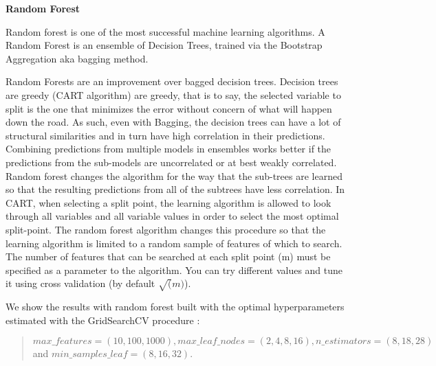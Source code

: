 \documentclass[11pt]{article}
\begin{document}
\textbf{Random Forest}

Random forest is one of the most successful machine learning algorithms. A Random Forest is an ensemble of Decision Trees, trained via the  Bootstrap Aggregation aka bagging method. 

Random Forests are an improvement over bagged decision trees. Decision trees are greedy (CART algorithm) are greedy, that is to say, the selected variable to split is the one that minimizes the error without concern of what will happen down the road. As such, even with Bagging, the decision trees can have a lot of structural similarities and in turn have high correlation in their predictions. Combining predictions from multiple models in ensembles works better if the predictions from the sub-models are uncorrelated or at best weakly correlated.
Random forest changes the algorithm for the way that the sub-trees are learned so that the resulting predictions from all of the subtrees have less correlation. In CART, when selecting a split point, the learning algorithm is allowed to look through all variables and all variable values in order to select the most optimal split-point. The random forest algorithm changes this procedure so that the learning algorithm is limited to a random sample of features of which to search. The number of features that can be searched at each split point (m) must be specified as a parameter to the algorithm. You can try different values and tune it using cross validation (by default $\sqrt(m)$).

We show the results with random forest built with the optimal hyperparameters estimated with the GridSearchCV procedure
: 
\begin{quote}
$max\_features=(10,100,1000), max\_leaf\_nodes=(2,4,8,16), n\_estimators=(8,18,28)$ and  $min\_samples\_leaf=(8,16,32)$.
\end{quote}
\end{document}
